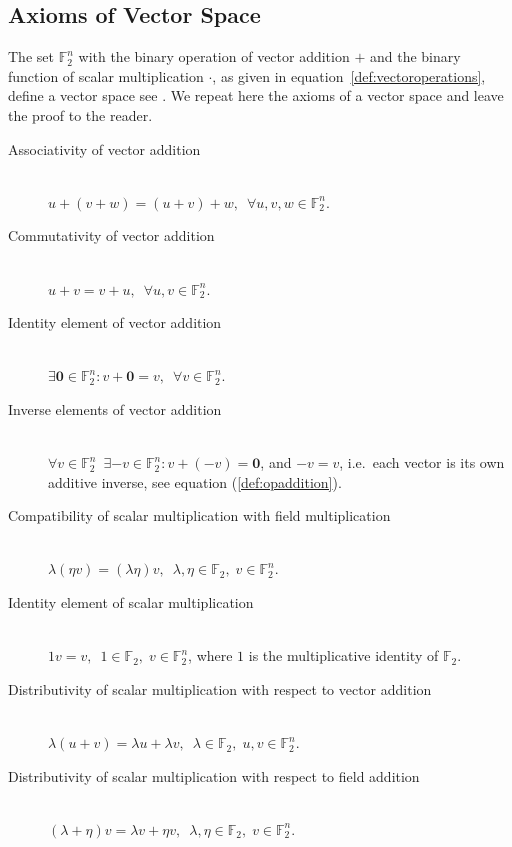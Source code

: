 \documentclass[a4paper]{article}
\newcommand{\BF}{\mathbb{F}}
\newcommand{\0}{\mathbf{0}}
\newcommand{\1}{\mathbf{1}}
\begin{document}
\subsection{Axioms of Vector Space}
The set $\BF_2^n$ with the binary operation of vector addition $+$ and the binary function of scalar multiplication $\cdot$,
as given in equation~\eqref{def:vectoroperations}, define a vector space see \cite{Fischer2020, wikipedia_en_2025_VectorSpace}. We repeat here the axioms of a vector space and leave the proof to the reader.

\begin{description}
\item[Associativity of vector addition] \ \\
$u + (v + w) = (u + v) + w, \enspace \forall u, v, w \in \BF_2^n$.
\item[Commutativity of vector addition] \ \\
$u + v = v + u, \enspace \forall u, v \in \BF_2^n$.
\item[Identity element of vector addition] \ \\
$\exists \0 \in \BF_2^n : v + \0 = v, \enspace \forall v \in \BF_2^n$.
\item[Inverse elements of vector addition] \ \\
$\forall v \in \BF_2^n \enspace \exists -v \in \BF_2^n : v + (-v) = \0$, and $-v = v$, i.e.\ each vector is its own additive inverse, 
see equation (\ref{def:opaddition}).
\end{description}

\begin{description}
\item[Compatibility of scalar multiplication with field multiplication] \ \\
$\lambda (\eta v) = (\lambda \eta) v, \enspace \lambda, \eta \in \BF_2, \; v \in \BF_2^n$.
\item[Identity element of scalar multiplication] \ \\
$1 v = v, \enspace 1 \in \BF_2, \; v \in \BF_2^n$, where $1$ is the multiplicative identity of $\BF_2$.
\item[Distributivity of scalar multiplication with respect to vector addition] \ \\
$\lambda (u + v) = \lambda u + \lambda v, \enspace \lambda \in \BF_2, \; u, v \in \BF_2^n$.
\item[Distributivity of scalar multiplication with respect to field addition] \ \\
$(\lambda + \eta) v = \lambda v + \eta v, \enspace \lambda, \eta \in \BF_2, \; v \in \BF_2^n$.
\end{description}
\end{document}
